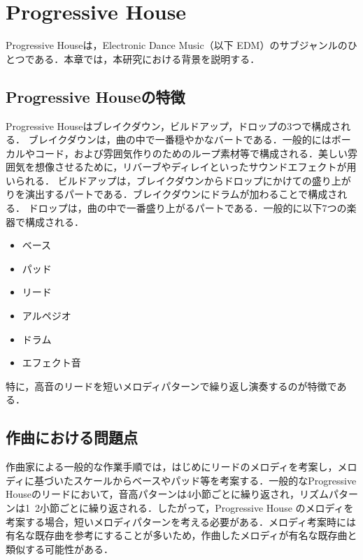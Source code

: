 \chapter{Progressive House}
Progressive Houseは，Electronic Dance Music（以下 EDM）のサブジャンルのひとつである．本章では，本研究における背景を説明する．

\section{Progressive Houseの特徴}
Progressive Houseはブレイクダウン，ビルドアップ，ドロップの3つで構成される．
ブレイクダウンは，曲の中で一番穏やかなバートである．一般的にはボーカルやコード，および雰囲気作りのためのループ素材等で構成される．美しい雰囲気を想像させるために，リバーブやディレイといったサウンドエフェクトが用いられる．
ビルドアップは，ブレイクダウンからドロップにかけての盛り上がりを演出するパートである．ブレイクダウンにドラムが加わることで構成される．
ドロップは，曲の中で一番盛り上がるパートである．一般的に以下7つの楽器で構成される．
\begin{itemize}
  \item ベース
  \item パッド
  \item リード
  \item アルペジオ
  \item ドラム
  \item エフェクト音
\end{itemize}
特に，高音のリードを短いメロディパターンで繰り返し演奏するのが特徴である．

\section{作曲における問題点}
作曲家による一般的な作業手順では，はじめにリードのメロディを考案し，メロディに基づいたスケールからベースやパッド等を考案する．一般的なProgressive Houseのリードにおいて，音高パターンは4小節ごとに繰り返され，リズムパターンは1~2小節ごとに繰り返される．したがって，Progressive House のメロディを考案する場合，短いメロディパターンを考える必要がある．メロディ考案時には有名な既存曲を参考にすることが多いため，作曲したメロディが有名な既存曲と類似する可能性がある．
